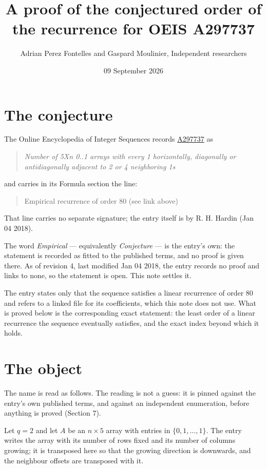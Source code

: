 \documentclass[11pt]{article}
\title{A proof of the conjectured order of the recurrence for OEIS A297737}
\author{Adrian Perez Fontelles and Gaspard Moulinier, Independent researchers}
\date{09 September 2026}
\theoremstyle{definition}
\begin{document}
\maketitle
\section{The conjecture}

The Online Encyclopedia of Integer Sequences records \href{https://oeis.org/A297737}{A297737} as

\begin{quote}\itshape Number of 5Xn 0..1 arrays with every 1 horizontally, diagonally or antidiagonally adjacent to 2 or 4 neighboring 1s\end{quote}

and carries in its Formula section the line:

\begin{quote}\ttfamily Empirical recurrence of order 80 (see link above)\end{quote}

That line carries no separate signature; the entry itself is by R. H. Hardin (Jan 04 2018).

The word {\itshape Empirical} --- equivalently {\itshape Conjecture} --- is the entry's own: the statement is recorded as fitted to the published terms, and no proof is given there. As of revision 4, last modified Jan 04 2018, the entry records no proof and links to none, so the statement is open. This note settles it.

The entry states only that the sequence satisfies a linear recurrence of order $80$ and refers to a linked file for its coefficients, which this note does not use. What is proved below is the corresponding exact statement: the least order of a linear recurrence the sequence eventually satisfies, and the exact index beyond which it holds.

\section{The object}

The name is read as follows. The reading is not a guess: it is pinned against the entry's own published terms, and against an independent enumeration, before anything is proved (Section 7).

Let $q = 2$ and let $A$ be an $n \times 5$ array with entries in $\{0,1,\dots,1\}$. The entry writes the array with its number of rows fixed and its number of columns growing; it is transposed here so that the growing direction is downwards, and the neighbour offsets are transposed with it.
\end{document}

